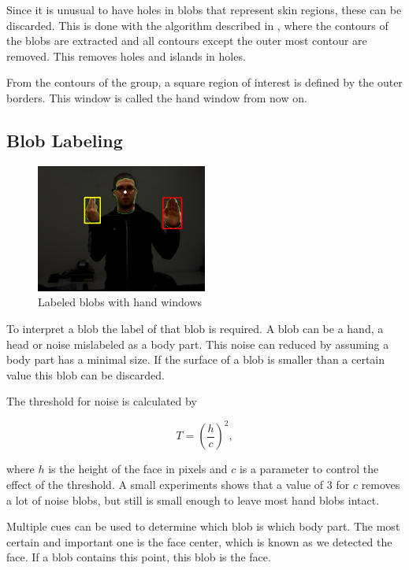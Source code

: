 Since it is unusual to have holes in blobs that represent skin regions, these can be discarded. This is done with the algorithm described in \citep{Suzuki1985}, where the contours of the blobs are extracted and all contours except the outer most contour are removed. This removes holes and islands in holes.

From the contours of the group, a square region of interest is defined by the outer borders. This window is called the hand window from now on.

\subsection*{Blob Labeling}

\begin{figure}[tb]
    \center{}
    \includegraphics[width=0.5\textwidth]{figures/pipeline/contours.jpg}
	\caption{Labeled blobs with hand windows}
	\label{fig:contours}
\end{figure}

To interpret a blob the label of that blob is required. A blob can be a hand, a head or noise mislabeled as a body part. This noise can reduced by assuming a body part has a minimal size. If the surface of a blob is smaller than a certain value this blob can be discarded.

The threshold for noise is calculated by

\begin{equation}
T = (\frac{h}{c})^2,
\end{equation}

where $h$ is the height of the face in pixels and $c$ is a parameter to control the effect of the threshold. A small experiments shows that a value of $3$ for $c$ removes a lot of noise blobs, but still is small enough to leave most hand blobs intact.

Multiple cues can be used to determine which blob is which body part. The most  certain and important one is the face center, which is known as we detected the face. If a blob contains this point, this blob is the face. 

